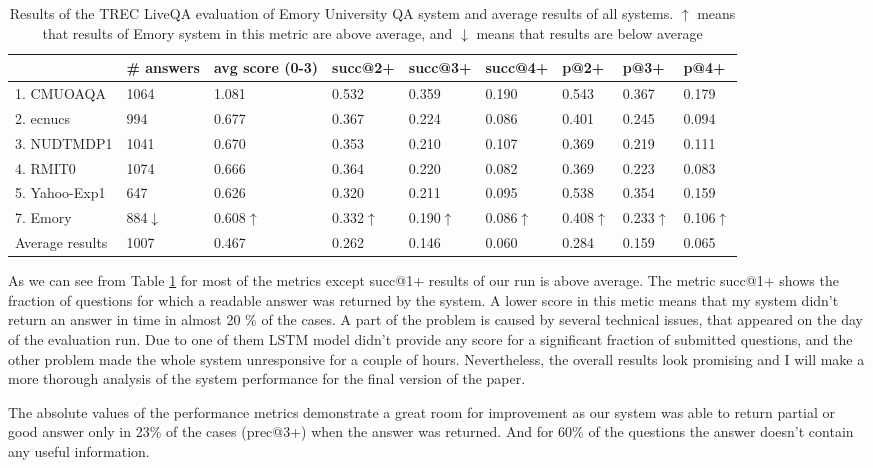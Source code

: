 \documentclass[]{article}
\begin{document}
\begin{table}
\caption{Results of the TREC LiveQA evaluation of Emory University QA system and average results of all systems. $\uparrow$ means that results of Emory system in this metric are above average, and $\downarrow$ means that results are below average}
\label{table:liveqa-results}
\begin{tabular}{|p{2.5cm}|p{1.7cm}|p{1.3cm}|p{1.3cm}|p{1.3cm}|p{1.3cm}|p{1cm}|p{1cm}|p{1cm}|}
\hline
 & \# answers & avg score (0-3) & succ@2+ & succ@3+ & succ@4+ & p@2+ &  p@3+ & p@4+ \\
\hline
1. CMUOAQA & 1064 & 1.081 & 0.532 & 0.359 & 0.190 & 0.543 & 0.367 & 0.179 \\
2. ecnucs & 994 & 0.677 & 0.367 & 0.224 & 0.086 & 0.401 & 0.245 & 0.094\\
3. NUDTMDP1 & 1041 & 0.670 & 0.353 & 0.210 & 0.107 & 0.369 & 0.219 & 0.111\\
4. RMIT0 & 1074 & 0.666 & 0.364 & 0.220 & 0.082 & 0.369 & 0.223 & 0.083\\
5. Yahoo-Exp1 & 647 & 0.626 & 0.320 & 0.211 & 0.095 & 0.538 & 0.354 & 0.159\\
\hline
7. Emory & 884$\downarrow$ & 0.608$\uparrow$ & 0.332$\uparrow$ & 0.190$\uparrow$ & 0.086$\uparrow$ & 0.408$\uparrow$ & 0.233$\uparrow$ & 0.106$\uparrow$\\
\hline
Average results & 1007 & 0.467 & 0.262 & 0.146 & 0.060 & 0.284 & 0.159 & 0.065\\
\hline
\end{tabular}
\end{table}

As we can see from Table \ref{table:liveqa-results} for most of the metrics except succ@1+ results of our run is above average.
The metric succ@1+ shows the fraction of questions for which a readable answer was returned by the system.
A lower score in this metic means that my system didn't return an answer in time in almost 20 \% of the cases.
A part of the problem is caused by several technical issues, that appeared on the day of the evaluation run.
Due to one of them LSTM model didn't provide any score for a significant fraction of submitted questions, and the other problem made the whole system unresponsive for a couple of hours.
Nevertheless, the overall results look promising and I will make a more thorough analysis of the system performance for the final version of the paper.

The absolute values of the performance metrics demonstrate a great room for improvement as our system was able to return partial or good answer only in 23\% of the cases (prec@3+) when the answer was returned.
And for 60\% of the questions the answer doesn't contain any useful information.
\end{document}
